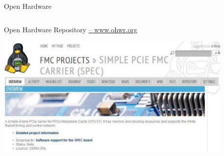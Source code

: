 \documentclass[compress,red]{beamer}
\begin{document}
\begin{frame}{Open Hardware}
\begin{columns}[c]
  \end{columns}
\end{frame}
\begin{frame}{Open Hardware Repository \href{http://ohwr.org}{-- www.ohwr.org}}

 \begin{center}
   \includegraphics[height=6cm]{../../figures/ohwr/ohr_spec_top.pdf}
 \end{center} 

\end{frame}
\end{document}
